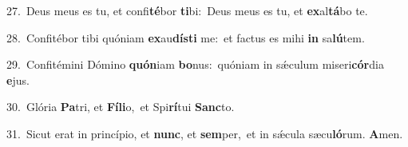 {\numbfont\textcolor{\numbcolor}{27.}}~Deus meus es tu, et confi\-\textbf{té}\-bor \textbf{ti}\-bi:~\star Deus meus es tu, et \textbf{ex}\-al\-\textbf{tá}\-bo te.\par
{\numbfont\textcolor{\numbcolor}{28.}}~Confitébor tibi quóniam \textbf{ex}\-au\-\textbf{dís}\-\textbf{ti} me:~\star et factus es mihi \textbf{in} sa\-\textbf{lú}\-tem.\par
{\numbfont\textcolor{\numbcolor}{29.}}~Confitémini Dómino \textbf{quón}\-iam \textbf{bo}\-nus:~\star quóniam in sǽculum miseri\-\textbf{cór}\-dia \textbf{e}\-jus.\par
{\numbfont\textcolor{\numbcolor}{30.}}~Glória \textbf{Pa}\-tri, et \textbf{Fí}\-\textbf{li}o,~\star et Spi\-\textbf{rí}\-tui \textbf{Sanc}\-to.\par
{\numbfont\textcolor{\numbcolor}{31.}}~Sicut erat in princípio, et \textbf{nunc}\-, et \textbf{sem}\-per,~\star et in sǽcula sæcu\-\textbf{ló}\-rum. \textbf{A}\-men.\par
